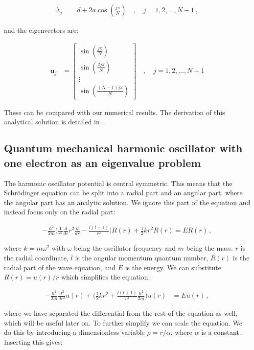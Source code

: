 \documentclass[reprint,english,notitlepage]{revtex4-1}  %
\begin{document}
\begin{align*}
\lambda_j &= d + 2a \cos ( \frac{j\pi}{N}) \quad , \quad j = 1,2,...,N-1 \, ,
\end{align*}

and the eigenvectors are:

\begin{align*}
\textbf{u}_j &= \begin{bmatrix}
\sin( \frac{j\pi}{N} ) \\
\sin( \frac{2j\pi}{N} ) \\
\vdots \\
\sin( \frac{(N-1)j\pi}{N} ) 
\end{bmatrix} \quad , \quad j = 1,2,...,N-1
\end{align*}

These can be compared with our numerical results. The derivation of this analytical solution is detailed in \citep{Lyche2017}. 



\subsection{Quantum mechanical harmonic oscillator with one electron as an eigenvalue problem} \label{sec:II:d}

The harmonic oscillator potential is central symmetric. This means that the Schrödinger equation can be split into a radial part and an angular part, where the angular part has an analytic solution. We ignore this part of the equation and instead focus only on the radial part:

\begin{align*}
-\frac{\hbar^2}{2m} \bigg( \frac{1}{r^2} \frac{d}{dr}r^2 \frac{d}{dr} - \frac{l(l+1)}{r^2} \bigg) R(r) + \frac{1}{2}kr^2 R(r) = ER(r) \, ,
\end{align*} 

where $k = m\omega^2$ with $\omega$ being the oscillator frequency and $m$ being the mass. $r$ is the radial coordinate, $l$ is the angular momentum quantum number, $R(r)$ is the radial part of the wave equation, and $E$ is the energy. We can substitute $R(r) = u(r)/r$ which simplifies the equation:

\begin{align*}
-\frac{\hbar^2}{2m} \frac{d^2}{dr^2} u(r) + \bigg( \frac{1}{2}kr^2 + \frac{l(l+1)}{r^2} \frac{\hbar^2}{2m} \bigg) u(r) &= Eu(r) \, ,
\end{align*}

where we have separated the differential from the rest of the equation as well, which will be useful later on. To further simplify we can scale the equation. We do this by introducing a dimensionless variable $\rho = r/\alpha$, where $\alpha$ is a constant. Inserting this gives:
\end{document}
